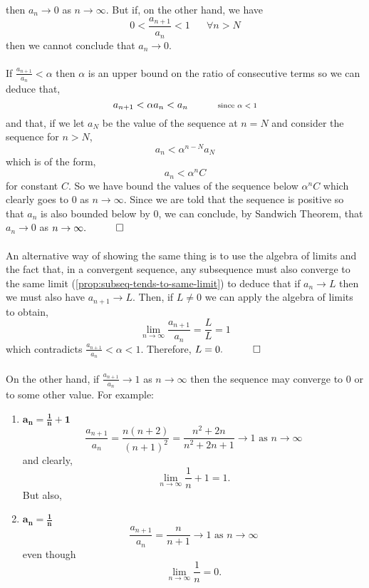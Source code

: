 \documentclass[../MathsNotesBase.tex]{subfiles}
\begin{document}
{\begin{exe}
{{{						then ${ a_n \to 0 }$ as ${ n \to \infty }$. But if, on the other hand, we have
						\[ 0 < \frac{a_{n+1}}{a_n} < 1 \hspace{20pt} \forall n > N \]
						then we cannot conclude that ${ a_n \to 0 }$.
				 }}\\\\
				If ${ \frac{a_{n+1}}{a_n} < \alpha }$ then $\alpha$ is an upper bound on the ratio of consecutive terms so we can deduce that,
				\[ a_{n+1} < \alpha a_n < a_n \hspace{30pt} \text{\scriptsize{since ${ \alpha < 1 }$}} \]
				and that, if we let ${ a_N }$ be the value of the sequence at ${ n = N }$ and consider the sequence for ${ n > N }$,
				\[ a_n < \alpha^{n - N}a_N \]
				which is of the form,
				\[ a_n < \alpha^n C \]
				for constant $C$. So we have bound the values of the sequence below ${ \alpha^n C }$ which clearly goes to 0 as ${ n \to \infty }$. Since we are told that the sequence is positive so that $a_n$ is also bounded below by 0, we can conclude, by Sandwich Theorem, that ${ a_n \to 0 }$ as ${ n \to \infty. \hspace{10pt}\qed}$\\\\
				An alternative way of showing the same thing is to use the algebra of limits and the fact that, in a convergent sequence, any subsequence must also converge to the same limit (\autoref{prop:subseq-tends-to-same-limit}) to deduce that if ${ a_n \to L }$ then we must also have ${ a_{n+1} \to L }$. Then, if ${ L \neq 0 }$ we can apply the algebra of limits to obtain,
				\[ \lim_{n \to \infty} \frac{a_{n+1}}{a_n} = \frac{L}{L} = 1 \]
				which contradicts ${ \frac{a_{n+1}}{a_n} < \alpha < 1 }$. Therefore, ${ L = 0.  \hspace{10pt}\qed}$\\\\
				On the other hand, if ${ \frac{a_{n+1}}{a_n} \to 1 }$ as ${ n \to \infty }$ then the sequence may converge to 0 or to some other value. For example:
				\begin{enumerate}[label=(\roman*)]
					\item{${\bm{ a_n = \frac{1}{n} + 1 }}$}
					\[ \frac{a_{n+1}}{a_n} = \frac{n(n+2)}{(n+1)^2} =\frac{n^2 + 2n}{n^2 + 2n + 1} \to 1 \text{ as } n \to \infty \]
					and clearly,
					\[ \lim_{n \to \infty} \frac{1}{n} + 1 = 1. \]
					But also,
					\item{${\bm{ a_n = \frac{1}{n} }}$}
					\[  \frac{a_{n+1}}{a_n} = \frac{n}{n+1} \to 1 \text{ as } n \to \infty \]
					even though
					\[ \lim_{n \to \infty} \frac{1}{n} = 0. \]
				\end{enumerate}
			}
						

\end{exe}}
\end{document}
